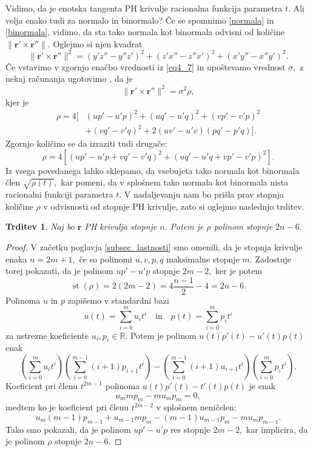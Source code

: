 \documentclass[12pt,a4paper,twoside]{article}
\theoremstyle{definition} %
\theoremstyle{plain} %
\newtheorem{trditev}[definicija]{Trditev}
\theoremstyle{primerstyle}
\numberwithin{equation}{section}  %
\newcommand{\R}{\mathbb R}
\newcommand{\rV}{\mathbf{r}}
\DeclareMathOperator{\st}{st}
\begin{document}
Vidimo, da je enotska tangenta PH krivulje racionalna funkcija parametra $t.$ Ali velja enako tudi za normalo in binormalo? Če se spomnimo \eqref{normala} in \eqref{binormala}, vidimo, da sta tako normala kot binormala odvisni od količine $\lVert \rV' \times \rV'' \rVert.$ Oglejmo si njen kvadrat
\begin{equation}
	\label{eq4_12}
	\lVert \rV' \times \rV'' \rVert^2=(y'z''-y''z')^2+(z'x''-z''x')^2+(x'y''-x''y')^2.
\end{equation}
Če vstavimo v zgornjo enačbo vrednosti iz \eqref{eq4_7} in upoštevamo vrednost $\sigma,$ z nekaj računanja ugotovimo \cite{farouki2002exact}, da je
\begin{equation}
	\label{eq4_13}
	\lVert \rV' \times \rV'' \rVert^2=\sigma^2\rho,
\end{equation}
kjer je
\begin{align}
	\rho=4[&(up'-u'p)^2+(uq'-u'q)^2+(vp'-v'p)^2 \nonumber \\
	&+(vq'-v'q)^2+2(uv'-u'v)(pq'-p'q)]. \label{rho1}
\end{align}
Zgornjo količino se da izraziti \cite{beltranmonterde} tudi drugače:
\begin{equation}
	\label{rho2}
	\rho=4[(up'-u'p+vq'-v'q)^2+(uq'-u'q+vp'-v'p)^2].
\end{equation}
Iz vsega povedanega lahko sklepamo, da vsebujeta tako normala kot binormala člen $\sqrt{\rho(t)},$ kar pomeni, da v splošnem tako normala kot binormala nista racionalni funkciji parametra $t.$ V nadaljevanju nam bo prišla prav stopnja količine $\rho$ v odvisnosti od stopnje PH krivulje, zato si oglejmo naslednjo trditev.
\begin{trditev}
	\label{stopnja_rho_trditev}
	Naj bo $\rV$ PH krivulja stopnje $n.$ Potem je $\rho$ polinom stopnje $2n-6.$
\end{trditev}
\begin{proof}
	V začetku poglavja \ref{subsec_lastnosti} smo omenili, da je stopnja krivulje enaka $n=2m+1,$ če so polinomi $u,v,p,q$ maksimalne stopnje $m.$ Zadostuje torej pokazati, da je polinom $up'-u'p$ stopnje $2m-2,$ ker je potem $$\st(\rho)=2(2m-2)=4\frac{n-1}{2}-4=2n-6.$$ Polinoma $u$ in $p$ zapišemo v standardni bazi
	$$u(t)=\sum_{i=0}^mu_it^i\quad\text{in}\quad p(t)=\sum_{i=0}^mp_it^i$$
	za ustrezne koeficiente $u_i,p_i\in\R.$ Potem je polinom $u(t)p'(t)-u'(t)p(t)$ enak
	\begin{equation*}
		\left(\sum_{i=0}^mu_it^i\right)\left(\sum_{i=0}^{m-1}(i+1)p_{i+1}t^i\right)-\left(\sum_{i=0}^{m-1}(i+1)u_{i+1}t^i\right)\left(\sum_{i=0}^mp_it^i\right).
	\end{equation*}
	Koeficient pri členu $t^{2m-1}$ polinoma $u(t)p'(t)-t'(t)p(t)$ je enak
	$$u_mmp_m-mu_mp_m=0,$$
	medtem ko je koeficient pri členu $t^{2m-2}$ v splošnem neničelen:
	$$u_m(m-1)p_{m-1}+u_{m-1}mp_m-(m-1)u_{m-1}p_m-mu_mp_{m-1}.$$
	Tako smo pokazali, da je polinom $up'-u'p$ res stopnje $2m-2,$ kar implicira, da je polinom $\rho$ stopnje $2n-6.$
\end{proof}
\end{document}
